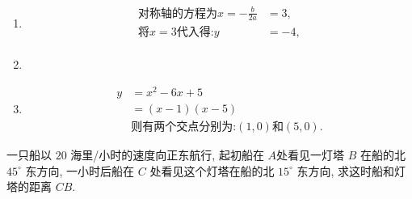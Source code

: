 \begin{questions}
	\begin{solution}
		\begin{enumerate}[label=(\arabic*)]
			\item
			      \begin{align*}
				      \text{对称轴的方程为} x = -\frac{b}{2a} & = 3,  \\
				      \text{将} x = 3 \text{代入得:} y     & = -4, \\
			      \end{align*}
			\item
			      \begin{center}
			      \end{center}

			\item \begin{align*}
				      y & = x^2 - 6x + 5                            \\
				        & = (x - 1)(x - 5)                          \\
				        & \text{则有两个交点分别为:} (1, 0) \text{和} (5, 0).
			      \end{align*}
		\end{enumerate}

	\end{solution}

	\question 一只船以 $20$ 海里/小时的速度向正东航行, 起初船在 $A$处看见一灯塔 $B$ 在船的北 $45^\circ$ 东方向, 一小时后船在
	$C$ 处看见这个灯塔在船的北 $15^\circ$ 东方向, 求这时船和灯塔的距离 $CB$.


\end{questions}
